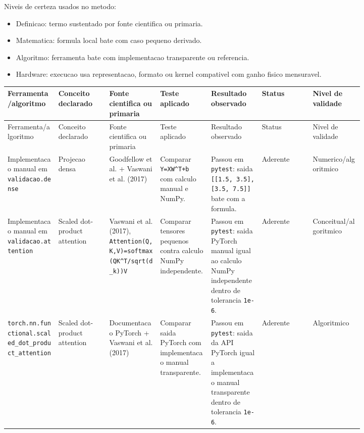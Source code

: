 Niveis de certeza usados no metodo:


\begin{itemize}
\item Definicao: termo sustentado por fonte cientifica ou primaria.
\item Matematica: formula local bate com caso pequeno derivado.
\item Algoritmo: ferramenta bate com implementacao transparente ou referencia.
\item Hardware: execucao usa representacao, formato ou kernel compativel com ganho
fisico mensuravel.
\end{itemize}


\begin{landscape}
\scriptsize
\begin{longtable}{@{}>{\RaggedRight\arraybackslash}p{0.117\linewidth}>{\RaggedRight\arraybackslash}p{0.117\linewidth}>{\RaggedRight\arraybackslash}p{0.117\linewidth}>{\RaggedRight\arraybackslash}p{0.117\linewidth}>{\RaggedRight\arraybackslash}p{0.117\linewidth}>{\RaggedRight\arraybackslash}p{0.117\linewidth}>{\RaggedRight\arraybackslash}p{0.117\linewidth}@{}}
\toprule
Ferramenta/algoritmo & Conceito declarado & Fonte cientifica ou primaria & Teste aplicado & Resultado observado & Status & Nivel de validade \\
\midrule
\endfirsthead
\toprule
Ferramenta/algoritmo & Conceito declarado & Fonte cientifica ou primaria & Teste aplicado & Resultado observado & Status & Nivel de validade \\
\midrule
\endhead
Implementacao manual em \texttt{validacao.\allowbreak{}dense} & Projecao densa & Goodfellow et al. + Vaswani et al. (2017) & Comparar \texttt{Y=XW\textasciicircum{}T+b} com calculo manual e NumPy. & Passou em \texttt{pytest}: saida \texttt{[[1.\allowbreak{}5, 3.\allowbreak{}5], [3.\allowbreak{}5, 7.\allowbreak{}5]]} bate com a formula. & Aderente & Numerico/algoritmico \\
Implementacao manual em \texttt{validacao.\allowbreak{}attention} & Scaled dot-product attention & Vaswani et al. (2017), \texttt{Attention\allowbreak{}(Q,K,V)\allowbreak{}=softmax\allowbreak{}(QK\textasciicircum{}T/\allowbreak{}sqrt(d\_\allowbreak{}k))V} & Comparar tensores pequenos contra calculo NumPy independente. & Passou em \texttt{pytest}: saida PyTorch manual igual ao calculo NumPy independente dentro de tolerancia \texttt{1e-6}. & Aderente & Conceitual/\allowbreak{}algoritmico \\
\texttt{torch.\allowbreak{}nn.\allowbreak{}functional.\allowbreak{}scaled\_\allowbreak{}dot\_\allowbreak{}product\_\allowbreak{}attention} & Scaled dot-product attention & Documentacao PyTorch + Vaswani et al. (2017) & Comparar saida PyTorch com implementacao manual transparente. & Passou em \texttt{pytest}: saida da API PyTorch igual a implementacao manual transparente dentro de tolerancia \texttt{1e-6}. & Aderente & Algoritmico \\

\end{longtable}
\end{landscape}

